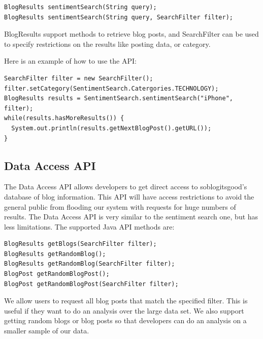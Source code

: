 \documentclass[titlepage]{article}
\begin{document}
\begin{verbatim}
BlogResults sentimentSearch(String query);
BlogResults sentimentSearch(String query, SearchFilter filter);
\end{verbatim}

BlogResults support methods to retrieve blog posts, and SearchFilter can be
used to specify restrictions on the results like posting data, or category.

Here is an example of how to use the API:
\begin{verbatim}
SearchFilter filter = new SearchFilter();
filter.setCategory(SentimentSearch.Catergories.TECHNOLOGY);
BlogResults results = SentimentSearch.sentimentSearch("iPhone", filter);
while(results.hasMoreResults()) {
  System.out.println(results.getNextBlogPost().getURL());
}
\end{verbatim}

\subsection{Data Access API}
The Data Access API allows developers to get direct access to \textsf{soblogitsgood}'s
database of blog information.  This API will have access restrictions to avoid
the general public from flooding our system with requests for huge numbers of
results.  The Data Access API is very similar to the sentiment search one, but
has less limitations.  The supported Java API methods are:

\begin{verbatim}
BlogResults getBlogs(SearchFilter filter);
BlogResults getRandomBlog();
BlogResults getRandomBlog(SearchFilter filter);
BlogPost getRandomBlogPost();
BlogPost getRandomBlogPost(SearchFilter filter);
\end{verbatim}

We allow users to request all blog posts that match the specified filter.
This is useful if they want to do an analysis over the large data set.  We
also support getting random blogs or blog posts so that developers can do an
analysis on a smaller sample of our data.
\end{document}
